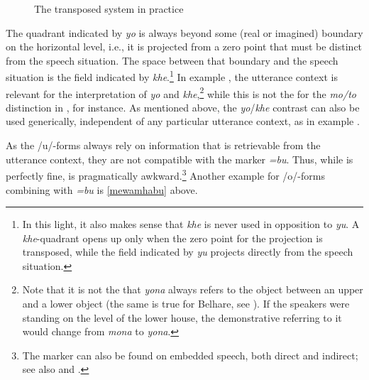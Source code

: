 \begin{figure}
\centering
\setlength{\fboxsep}{0pt}
\caption{The transposed system in practice}\label{deixill-3}
\end{figure}

\largerpage[2]
The quadrant indicated by \emph{yo} is always beyond some (real or imagined) boundary on the horizontal level, i.e., it is projected from a zero point that must be distinct from the speech situation. The space between that boundary and the speech situation is the field indicated by \emph{khe}.\footnote{In this light, it also makes sense that \emph{khe} is never used in opposition to \emph{yu}. A \emph{khe}-quadrant opens up only when the zero point for the projection is transposed, while the field indicated by \emph{yu} projects directly from the speech situation.} In  example \Last[a], the  utterance context is relevant for the interpretation of \emph{yo} and \emph{khe},\footnote{Note that it is not the  that \emph{yona} always refers to the object between an upper and a lower object (the same is true for Belhare, see \citealt{Bickel2001Deictic}).  If the speakers were standing on the level of the lower house, the demonstrative referring to it would change from \emph{mona} to \emph{yona}.} while this is not the  for the \emph{mo/to} distinction in \LLast[b], for instance. As mentioned above, the \emph{yo}/\emph{khe}  contrast can also be used generically, independent  of any particular utterance context, as in example  \Last[b].
 
As the /u/-forms always rely on information that is retrievable from the utterance context, they are not compatible with the  marker \emph{=bu}. Thus, while \Next[a] is perfectly fine, \Next[b] is pragmatically awkward.\footnote{The  marker can also be found on embedded speech, both direct and indirect; see also  and .} Another example for /o/-forms combining with \emph{=bu} is \ref{mewamhabu} above.

